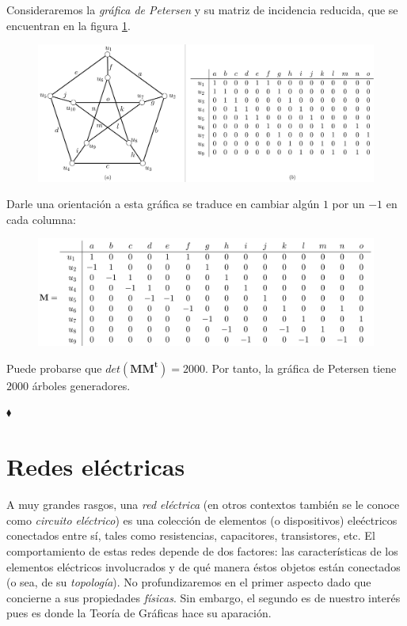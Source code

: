 \begin{ejem}
Consideraremos la \textit{gráfica de Petersen} y su matriz de incidencia reducida, que se encuentran en la figura \ref{fig:petersen}.

\begin{figure}[H]
    \centering
    \includegraphics[scale=0.14]{img/imgchapter4/petersen.jpg}
    \caption{}
    \label{fig:petersen}
\end{figure}

Darle una orientación a esta gráfica se traduce en cambiar algún $1$ por un $-1$ en cada columna:

\begin{figure}[H]
    \centering
    \includegraphics[scale=0.16]{img/imgchapter4/petersendirigido.jpg}
    \caption{}
    \label{fig:petersendirigido}
\end{figure}

Puede probarse que $det(\mathbf{M}\mathbf{M^{t}}) = 2000$. Por tanto, la gráfica de Petersen tiene $2000$ árboles generadores.      

\hfill $\blacklozenge$
\end{ejem}


\section{Redes eléctricas}
A muy grandes rasgos, una \textit{red eléctrica} (en otros contextos también se le conoce como \textit{circuito eléctrico}) es una colección de elementos (o dispositivos) eleéctricos conectados entre sí, tales como resistencias, capacitores, transistores, etc. El comportamiento de estas redes depende de dos factores: las características de los elementos eléctricos involucrados y de qué manera éstos objetos están conectados (o sea, de su \textit{topología}). No profundizaremos en el primer aspecto dado que concierne a sus propiedades \textit{físicas}. Sin embargo, el segundo es de nuestro interés pues es donde la Teoría de Gráficas hace su aparación.

